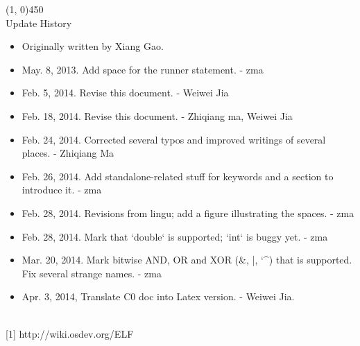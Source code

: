 \documentclass[a4paper]{article}
\begin{document}
\line(1, 0){450}\\

Update History\\

\begin{itemize}
	\item Originally written by Xiang Gao.
	\item May. 8, 2013. Add space for the runner statement. - zma
	\item Feb. 5, 2014. Revise this document. - Weiwei Jia
	\item Feb. 18, 2014. Revise this document. - Zhiqiang ma, Weiwei Jia
	\item Feb. 24, 2014. Corrected several typos and improved writings of several places. - Zhiqiang Ma
	\item Feb. 26, 2014. Add standalone-related stuff for keywords and a section to introduce it. - zma
	\item Feb. 28, 2014. Revisions from lingu; add a figure illustrating the spaces. - zma
	\item Feb. 28, 2014. Mark that `double` is supported; `int` is buggy yet. - zma
	\item Mar. 20, 2014. Mark bitwise AND, OR and XOR (\&, |, {\char`\^}) that is supported. Fix several strange names. - zma
	\item Apr. 3, 2014, Translate C0 doc into Latex version. - Weiwei Jia.
\end{itemize}

\\

[1] http://wiki.osdev.org/ELF
\end{document}
